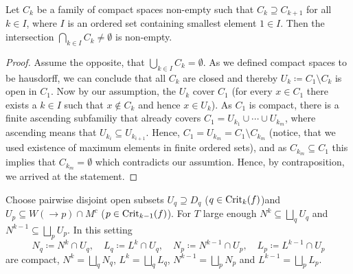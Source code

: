 \begin{lemma}\label{lem:morseFiltr-cantorsIntersectionTheorem}
	Let $C_k$ be a family of compact spaces non-empty such that $C_k\supseteq C_{k+1}$ for all $k\in I$, where $I$ is an ordered set containing smallest element $1\in I$. Then the intersection 
	$\bigcap_{k\in I} C_k \neq \emptyset$ is non-empty.
\end{lemma}
\begin{proof}
	Assume the opposite, that $\bigcup_{k\in I} C_k=\emptyset$.
	 As we defined compact spaces to be hausdorff, we can conclude that all $C_k$ are closed and thereby $U_k\coloneq C_1\setminus C_k$ is open in $C_1$. Now by our assumption, the $U_k$ cover $C_1$ (for every $x\in C_1$ there exists a $k\in I$ such that $x\notin C_k$ and hence $x\in U_k$). As $C_1$ is compact, there is a finite ascending subfamiliy that already covers $C_1=U_{k_1}\cup \cdots \cup U_{k_m}$, where ascending means that $U_{k_i}\subseteq U_{k_{i+1}}$. Hence, $C_1=U_{k_m}=C_1\setminus C_{k_m}$ (notice, that we used existence of maximum elements in finite ordered sets), and as $C_{k_m} \subseteq C_1$ this implies that $C_{k_m}=\emptyset$ which contradicts our assumtion. Hence, by contraposition, we arrived at the statement. 
\end{proof}
\begin{lemma}\label{lem:morseFilt-piecesOfGlobalSetup}
	Choose pairwise disjoint open subsets $U_q\supseteq D_q$ ($q\in \mathrm{Crit}_k(f)$)and $U_p\subseteq W(\to p)\cap M^c$ ($p\in \mathrm{Crit}_{k-1}(f)$). For $T$ large enough 
	$N^k\subseteq \bigsqcup_q U_q$ and $N^{k-1}\subseteq \bigsqcup_p U_p$. In this setting
	\begin{equation*}
		N_q\coloneq N^k 	\cap U_q, \quad L_q \coloneq L^k    \cap U_q,\quad 
		N_p\coloneq N^{k-1} \cap U_p, \quad L_p \coloneq L^{k-1}\cap U_p
	\end{equation*} are compact, $N^k=\bigsqcup_qN_q$, $L^k=\bigsqcup_q L_q$, $N^{k-1}=\bigsqcup_p N_p$ and $L^{k-1}=\bigsqcup_p L_p$.
\end{lemma}
